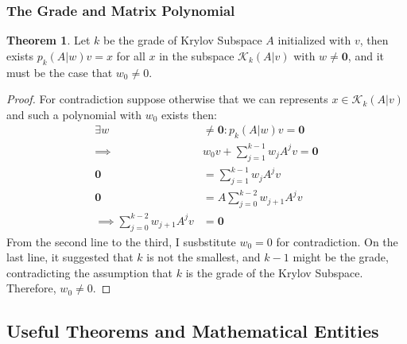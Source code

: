 \documentclass[]{article}
\theoremstyle{definition}
\newtheorem{theorem}{Theorem}  %
\begin{document}
        \subsubsection{The Grade and Matrix Polynomial}
            \begin{theorem}\label{theorem:2}
                Let $k$ be the grade of Krylov Subspace $A$ initialized with $v$, then exists $p_{k}(A|w)v = x$ for all $x$ in the subspace $\mathcal K_k(A|v)$ with $w\neq \mathbf 0$, and it must be the case that $w_0\neq 0$.
            \end{theorem}
            \begin{proof}
                For contradiction suppose otherwise that we can represents $x\in \mathcal K_k(A|v)$  and such a polynomial with $w_0$ exists then: 
                \begin{align}
                    \exists w &\neq \mathbf 0 : p_{k}(A|w)v = \mathbf 0 
                    \\
                    \implies& w_0v + \sum_{j = 1}^{k - 1} w_jA^jv = \mathbf 0
                    \\
                    \mathbf 0 &=\sum_{j = 1}^{k - 1} w_jA^jv
                    \\
                    \mathbf 0 &= A\sum_{j = 0}^{k - 2} w_{j + 1}A^jv
                    \\
                    \implies \sum_{j = 0}^{k - 2} w_{j + 1}A^jv &= \mathbf 0 
                \end{align}
                From the second line to the third, I susbstitute $w_0 = 0$ for contradiction. On the last line, it suggested that $k$ is not the smallest, and $k - 1$ might be the grade, contradicting the assumption that $k$ is the grade of the Krylov Subspace. Therefore, $w_0 \neq 0 $. 
            \end{proof}
    \subsection{Useful Theorems and Mathematical Entities}
\end{document}

